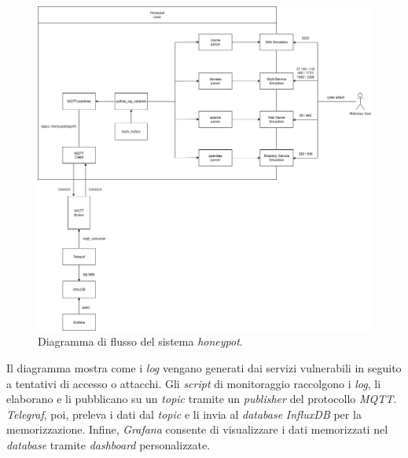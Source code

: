 \begin{figure}[H]
    \begin{center}
    \includegraphics[width=1.025\textwidth]{img/Diagramma-flusso.png}
    \caption{Diagramma di flusso del sistema \textit{honeypot}.}
    \label{fig:flowchart}
    \end{center}
\end{figure}
Il diagramma mostra come i \textit{log} vengano generati dai servizi vulnerabili in seguito a tentativi di accesso o attacchi.
Gli \textit{script} di monitoraggio raccolgono i \textit{log}, li elaborano e li pubblicano su un \textit{topic} tramite un \textit{publisher} del protocollo \textit{MQTT}.
\textit{Telegraf}, poi, preleva i dati dal \textit{topic} e li invia al \textit{database} \textit{InfluxDB} per la memorizzazione.
Infine, \textit{Grafana} consente di visualizzare i dati memorizzati nel \textit{database} tramite \textit{dashboard} personalizzate.
